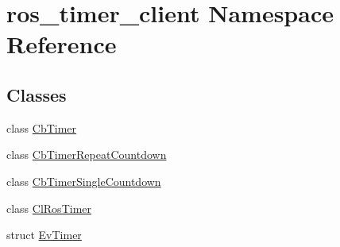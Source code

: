 \hypertarget{namespaceros__timer__client}{}\section{ros\+\_\+timer\+\_\+client Namespace Reference}
\label{namespaceros__timer__client}
\subsection*{Classes}
\begin{DoxyCompactItemize}
\item 
class \hyperlink{classros__timer__client_1_1CbTimer}{Cb\+Timer}
\item 
class \hyperlink{classros__timer__client_1_1CbTimerRepeatCountdown}{Cb\+Timer\+Repeat\+Countdown}
\item 
class \hyperlink{classros__timer__client_1_1CbTimerSingleCountdown}{Cb\+Timer\+Single\+Countdown}
\item 
class \hyperlink{classros__timer__client_1_1ClRosTimer}{Cl\+Ros\+Timer}
\item 
struct \hyperlink{structros__timer__client_1_1EvTimer}{Ev\+Timer}
\end{DoxyCompactItemize}
